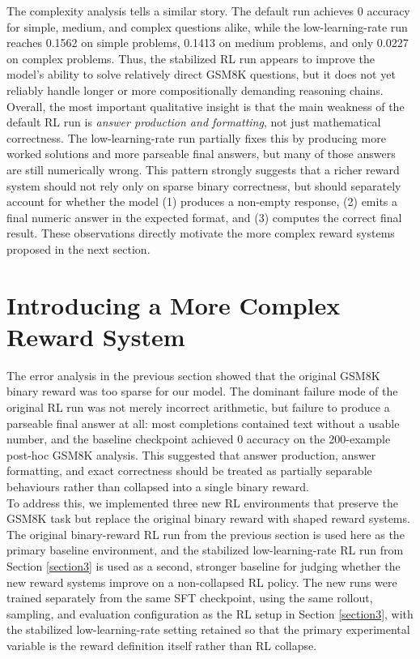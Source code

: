 \documentclass[a4paper,12pt]{article}
\begin{document}
The complexity analysis tells a similar story. The default run achieves 0 accuracy for simple, medium, and complex questions alike, while the low-learning-rate run reaches 0.1562 on simple problems, 0.1413 on medium problems, and only 0.0227 on complex problems. Thus, the stabilized RL run appears to improve the model's ability to solve relatively direct GSM8K questions, but it does not yet reliably handle longer or more compositionally demanding reasoning chains.\\

Overall, the most important qualitative insight is that the main weakness of the default RL run is \emph{answer production and formatting}, not just mathematical correctness. The low-learning-rate run partially fixes this by producing more worked solutions and more parseable final answers, but many of those answers are still numerically wrong. This pattern strongly suggests that a richer reward system should not rely only on sparse binary correctness, but should separately account for whether the model (1) produces a non-empty response, (2) emits a final numeric answer in the expected format, and (3) computes the correct final result. These observations directly motivate the more complex reward systems proposed in the next section.



\section{Introducing a More Complex Reward System}

The error analysis in the previous section showed that the original GSM8K binary reward was too sparse for our model. The dominant failure mode of the original RL run was not merely incorrect arithmetic, but failure to produce a parseable final answer at all: most completions contained text without a usable number, and the baseline checkpoint achieved 0 accuracy on the 200-example post-hoc GSM8K analysis. This suggested that answer production, answer formatting, and exact correctness should be treated as partially separable behaviours rather than collapsed into a single binary reward.\\

To address this, we implemented three new RL environments that preserve the GSM8K task but replace the original binary reward with shaped reward systems. The original binary-reward RL run from the previous section is used here as the primary baseline environment, and the stabilized low-learning-rate RL run from Section \ref{section3} is used as a second, stronger baseline for judging whether the new reward systems improve on a non-collapsed RL policy. The new runs were trained separately from the same SFT checkpoint, using the same rollout, sampling, and evaluation configuration as the RL setup in Section \ref{section3}, with the stabilized low-learning-rate setting retained so that the primary experimental variable is the reward definition itself rather than RL collapse.
\end{document}
